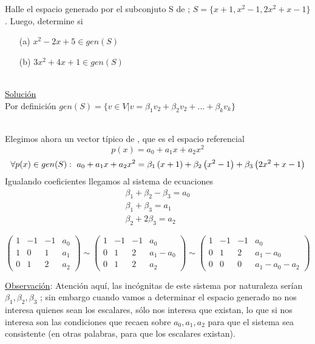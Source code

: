 \begin{ejemplo}
Halle el espacio generado por el subconjuto S de \pdos; $S=\lbrace
x+1, x^2-1, 2x^2+x-1\rbrace$. Luego, determine si 
\begin{enumerate}
\item[(a)]$x^2-2x+5 \in gen(S)$
\item[(b)]$3x^2+4x+1 \in gen(S)$
\end{enumerate}
\end{ejemplo}

~\\
\underline{Soluci\'on}
~\\
Por definici\'on $gen(S)=
\lbrace v\in V|v=
\beta_1 v_2+
\beta_2 v_2+
\ldots+
\beta_k v_k
\rbrace
$

~\\
Elegimos ahora un vector t\'ipico de \pdos, que es el espacio referencial
\[p(x)=a_0+a_1 x+a_2 x^2\]
$$\forall p(x)\in gen(S):\  
a_0+a_1 x+a_2 x^2=
 \beta_1\left(x+1\right) +
 \beta_2\left(x^2-1\right) +
 \beta_3\left(2x^2+x-1\right) 
$$
Igualando coeficientes llegamos al sistema de ecuaciones
\begin{eqnarray*}
\beta_1+\beta_2-\beta_3=a_0\\
\beta_1+\beta_3=a_1\\
\beta_2+2\beta_3=a_2
\end{eqnarray*}

\[
\left(
\begin{array}{rrr|r}
1&-1&-1&a_0\\
1&0&1&a_1\\
0&1&2&a_2
\end{array}
\right)
\sim
\left(
\begin{array}{rrr|r}
1&-1&-1&a_0\\
0&1&2&a_1-a_0\\
0&1&2&a_2
\end{array}
\right)
\sim
\left(
\begin{array}{rrr|r}
1&-1&-1&a_0\\
0&1&2&a_1-a_0\\
0&0&0&a_1-a_0-a_2
\end{array}
\right)
\]

\underline{Observaci\'on}: Atenci\'on aqu\'i, las inc\'ognitas de este sistema por naturaleza ser\'ian $\beta_1, \beta_2, \beta_3$
; sin embargo cuando vamos a determinar el espacio generado no nos interesa quienes sean los escalares, s\'olo nos interesa que existan, lo que si nos interesa son las condiciones que recaen sobre $a_0, a_1, a_2 $
para que el sistema sea consistente (en otras palabras, para que los escalares existan).


